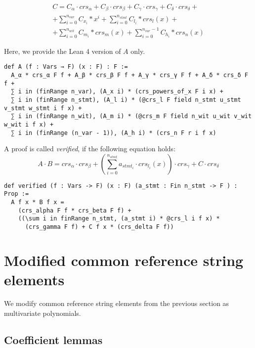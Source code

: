 \documentclass{article}
\theoremstyle{definition}
\theoremstyle{remark}
\begin{document}
\begin{multline}
C = C_{\alpha} \cdot crs_{\alpha} + C_{\beta} \cdot crs_{\beta} + C_{\gamma} \cdot crs_{\gamma} + C_{\delta} \cdot crs_{\delta} + \\
    + \sum \limits_{i = 0}^{n_{var}} C_{x_i} * x^i + \sum \limits_{i = 0}^{n_{stmt}} C_{l_i} * crs_l(x) + \\
    + \sum \limits_{i = 0}^{n_{wit}} C_{m_i} * crs_m(x) + \sum \limits_{i = 0}^{n_{var} - 1} C_{h_i} * crs_n(x)
\end{multline}

Here, we provide the Lean 4 version of $A$ only.

\begin{lstlisting}
def A (f : Vars → F) (x : F) : F :=
  A_α * crs_α F f + A_β * crs_β F f + A_γ * crs_γ F f + A_δ * crs_δ F f +
  ∑ i in (finRange n_var), (A_x i) * (crs_powers_of_x F i x) +
  ∑ i in (finRange n_stmt), (A_l i) * (@crs_l F field n_stmt u_stmt v_stmt w_stmt i f x) +
  ∑ i in (finRange n_wit), (A_m i) * (@crs_m F field n_wit u_wit v_wit w_wit i f x) +
  ∑ i in (finRange (n_var - 1)), (A_h i) * (crs_n F r i f x)
\end{lstlisting}

A proof is called \emph{verified}, if the following equation holds:
\begin{equation}
A \cdot B = crs_{\alpha} \cdot crs_{\beta} + \left(\sum \limits_{i = 0}^{n_{stmt}} a_{{stmt}_i} \cdot crs_{l_i}(x) \right) \cdot crs_{\gamma} + C \cdot crs_{\delta}
\end{equation}

\begin{lstlisting}
def verified (f : Vars -> F) (x : F) (a_stmt : Fin n_stmt -> F ) : Prop :=
  A f x * B f x =
    (crs_alpha F f * crs_beta F f) +
    ((\sum i in finRange n_stmt, (a_stmt i) * @crs_l i f x) *
      (crs_gamma F f) + C f x * (crs_delta F f))
\end{lstlisting}

\section{Modified common reference string elements}

We modify common reference string elements from the previous section as multivariate polynomials.

\subsection{Coefficient lemmas}
\end{document}
